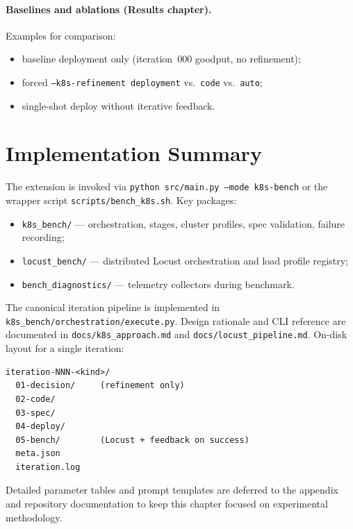 \paragraph{Baselines and ablations (Results chapter).}
Examples for comparison:
\begin{itemize}
  \item baseline deployment only (iteration~000 goodput, no refinement);
  \item forced \texttt{--k8s-refinement deployment} vs.\ \texttt{code} vs.\
        \texttt{auto};
  \item single-shot deploy without iterative feedback.
\end{itemize}


\section{Implementation Summary}
\label{sec:methods-implementation}

The extension is invoked via \texttt{python src/main.py --mode k8s-bench} or the
wrapper script \texttt{scripts/bench\_k8s.sh}.  Key packages:
\begin{itemize}
  \item \texttt{k8s\_bench/} --- orchestration, stages, cluster profiles,
        spec validation, failure recording;
  \item \texttt{locust\_bench/} --- distributed Locust orchestration and load
        profile registry;
  \item \texttt{bench\_diagnostics/} --- telemetry collectors during benchmark.
\end{itemize}

The canonical iteration pipeline is implemented in
\texttt{k8s\_bench/orchestration/execute.py}.  Design rationale and CLI
reference are documented in \texttt{docs/k8s\_approach.md} and
\texttt{docs/locust\_pipeline.md}.  On-disk layout for a single iteration:

\begin{verbatim}
iteration-NNN-<kind>/
  01-decision/     (refinement only)
  02-code/
  03-spec/
  04-deploy/
  05-bench/        (Locust + feedback on success)
  meta.json
  iteration.log
\end{verbatim}

Detailed parameter tables and prompt templates are deferred to the appendix
and repository documentation to keep this chapter focused on experimental
methodology.
